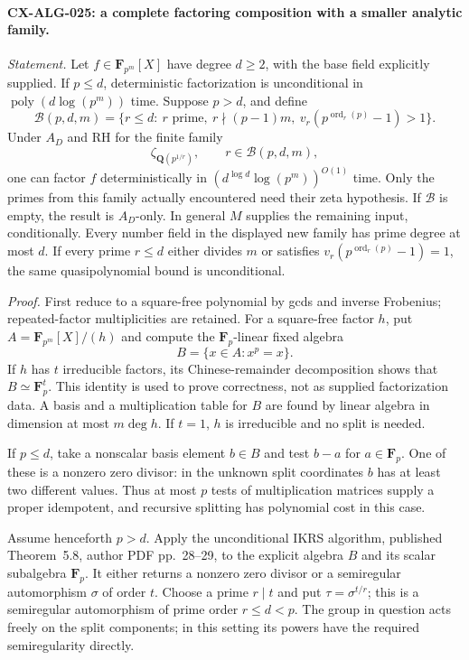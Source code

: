 \documentclass[11pt,a4paper]{article}
\begin{document}
\paragraph{CX-ALG-025: a complete factoring composition with a smaller analytic family.}
\emph{Statement.} Let $f\in\mathbf F_{p^m}[X]$ have degree $d\ge2$,
with the base field explicitly supplied. If $p\le d$, deterministic
factorization is unconditional in $\operatorname{poly}(d\log(p^m))$
time. Suppose $p>d$, and define
\[
 \mathcal B(p,d,m)=\{r\le d:\ r\text{ prime},\ r\nmid(p-1)m,
                 \ v_r(p^{\operatorname{ord}_r(p)}-1)>1\}.
\]
Under $A_D$ and RH for the finite family
\[
             \zeta_{\mathbf Q(p^{1/r})},\qquad r\in\mathcal B(p,d,m),
\]
one can factor $f$ deterministically in
$(d^{\log d}\log(p^m))^{O(1)}$ time. Only the primes from this family
actually encountered need their zeta hypothesis. If $\mathcal B$ is
empty, the result is $A_D$-only. In general $M$ supplies the remaining
input, conditionally. Every number field in the displayed new family
has prime degree at most $d$. If every prime $r\le d$ either divides
$m$ or satisfies $v_r(p^{\operatorname{ord}_r(p)}-1)=1$, the same
quasipolynomial bound is unconditional.

\emph{Proof.} First reduce to a square-free polynomial by gcds and
inverse Frobenius; repeated-factor multiplicities are retained.
For a square-free factor $h$, put
$A=\mathbf F_{p^m}[X]/(h)$ and compute the $\mathbf F_p$-linear fixed
algebra
\[
                         B=\{x\in A:x^p=x\}.
\]
If $h$ has $t$ irreducible factors, its Chinese-remainder decomposition
shows that $B\simeq\mathbf F_p^t$. This identity is used to prove
correctness, not as supplied factorization data. A basis and a
multiplication table for $B$ are found by linear algebra in dimension
at most $m\deg h$. If $t=1$, $h$ is irreducible and no split is needed.

If $p\le d$, take a nonscalar basis element $b\in B$ and test
$b-a$ for $a\in\mathbf F_p$. One of these is a nonzero zero divisor:
in the unknown split coordinates $b$ has at least two different values.
Thus at most $p$ tests of multiplication matrices supply a proper
idempotent, and recursive splitting has polynomial cost in this case.

Assume henceforth $p>d$. Apply the unconditional IKRS algorithm,
published Theorem~5.8, author PDF pp.~28--29, to the explicit algebra
$B$ and its scalar subalgebra $\mathbf F_p$. It either returns a
nonzero zero divisor or a semiregular automorphism $\sigma$ of order
$t$. Choose a prime $r\mid t$ and put $\tau=\sigma^{t/r}$;
this is a semiregular automorphism of prime order $r\le d<p$.
The group in question acts freely on the split components; in this
setting its powers have the required semiregularity directly.
\end{document}

